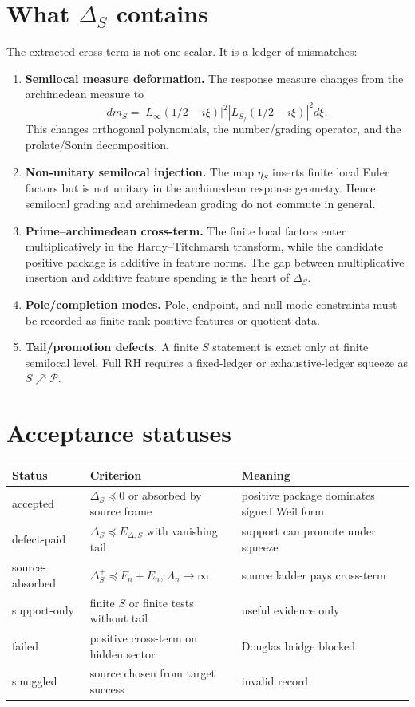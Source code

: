 \documentclass[11pt]{article}
\begin{document}
\section{What $\Delta_S$ contains}
The extracted cross-term is not one scalar.  It is a ledger of mismatches:
\begin{enumerate}[leftmargin=*]
\item \textbf{Semilocal measure deformation.}  The response measure changes from the archimedean measure to
\[
 dm_S=|L_\infty(1/2-i\xi)|^2|L_{S_f}(1/2-i\xi)|^2d\xi.
\]
This changes orthogonal polynomials, the number/grading operator, and the prolate/Sonin decomposition.

\item \textbf{Non-unitary semilocal injection.}  The map $\eta_S$ inserts finite local Euler factors but is not unitary in the archimedean response geometry.  Hence semilocal grading and archimedean grading do not commute in general.

\item \textbf{Prime--archimedean cross-term.}  The finite local factors enter multiplicatively in the Hardy--Titchmarsh transform, while the candidate positive package is additive in feature norms.  The gap between multiplicative insertion and additive feature spending is the heart of $\Delta_S$.

\item \textbf{Pole/completion modes.}  Pole, endpoint, and null-mode constraints must be recorded as finite-rank positive features or quotient data.

\item \textbf{Tail/promotion defects.}  A finite $S$ statement is exact only at finite semilocal level.  Full RH requires a fixed-ledger or exhaustive-ledger squeeze as $S\nearrow\mathcal P$.
\end{enumerate}

\section{Acceptance statuses}
\begin{center}
\begin{tabular}{lll}
\toprule
Status & Criterion & Meaning\\
\midrule
accepted & $\Delta_S\preceq0$ or absorbed by source frame & positive package dominates signed Weil form\\
defect-paid & $\Delta_S\preceq E_{\Delta,S}$ with vanishing tail & support can promote under squeeze\\
source-absorbed & $\Delta_S^+\preceq F_n+E_n$, $\Lambda_n\to\infty$ & source ladder pays cross-term\\
support-only & finite $S$ or finite tests without tail & useful evidence only\\
failed & positive cross-term on hidden sector & Douglas bridge blocked\\
smuggled & source chosen from target success & invalid record\\
\bottomrule
\end{tabular}
\end{center}
\end{document}
